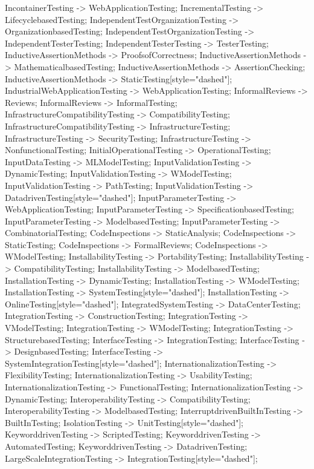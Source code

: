 \documentclass{article}
\begin{document}
{IncontainerTesting -> WebApplicationTesting;
IncrementalTesting -> LifecyclebasedTesting;
IndependentTestOrganizationTesting -> OrganizationbasedTesting;
IndependentTestOrganizationTesting -> IndependentTesterTesting;
IndependentTesterTesting -> TesterTesting;
InductiveAssertionMethods -> ProofsofCorrectness;
InductiveAssertionMethods -> MathematicalbasedTesting;
InductiveAssertionMethods -> AssertionChecking;
InductiveAssertionMethods -> StaticTesting[style="dashed"];
IndustrialWebApplicationTesting -> WebApplicationTesting;
InformalReviews -> Reviews;
InformalReviews -> InformalTesting;
InfrastructureCompatibilityTesting -> CompatibilityTesting;
InfrastructureCompatibilityTesting -> InfrastructureTesting;
InfrastructureTesting -> SecurityTesting;
InfrastructureTesting -> NonfunctionalTesting;
InitialOperationalTesting -> OperationalTesting;
InputDataTesting -> MLModelTesting;
InputValidationTesting -> DynamicTesting;
InputValidationTesting -> WModelTesting;
InputValidationTesting -> PathTesting;
InputValidationTesting -> DatadrivenTesting[style="dashed"];
InputParameterTesting -> WebApplicationTesting;
InputParameterTesting -> SpecificationbasedTesting;
InputParameterTesting -> ModelbasedTesting;
InputParameterTesting -> CombinatorialTesting;
CodeInspections -> StaticAnalysis;
CodeInspections -> StaticTesting;
CodeInspections -> FormalReviews;
CodeInspections -> WModelTesting;
InstallabilityTesting -> PortabilityTesting;
InstallabilityTesting -> CompatibilityTesting;
InstallabilityTesting -> ModelbasedTesting;
InstallationTesting -> DynamicTesting;
InstallationTesting -> WModelTesting;
InstallationTesting -> SystemTesting[style="dashed"];
InstallationTesting -> OnlineTesting[style="dashed"];
IntegratedSystemTesting -> DataCenterTesting;
IntegrationTesting -> ConstructionTesting;
IntegrationTesting -> VModelTesting;
IntegrationTesting -> WModelTesting;
IntegrationTesting -> StructurebasedTesting;
InterfaceTesting -> IntegrationTesting;
InterfaceTesting -> DesignbasedTesting;
InterfaceTesting -> SystemIntegrationTesting[style="dashed"];
InternationalizationTesting -> FlexibilityTesting;
InternationalizationTesting -> UsabilityTesting;
InternationalizationTesting -> FunctionalTesting;
InternationalizationTesting -> DynamicTesting;
InteroperabilityTesting -> CompatibilityTesting;
InteroperabilityTesting -> ModelbasedTesting;
InterruptdrivenBuiltInTesting -> BuiltInTesting;
IsolationTesting -> UnitTesting[style="dashed"];
KeyworddrivenTesting -> ScriptedTesting;
KeyworddrivenTesting -> AutomatedTesting;
KeyworddrivenTesting -> DatadrivenTesting;
LargeScaleIntegrationTesting -> IntegrationTesting[style="dashed"];
}
\end{document}
